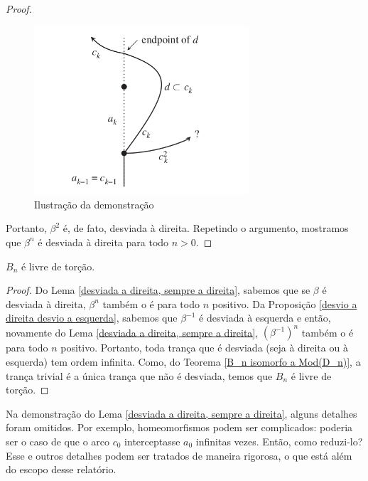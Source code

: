 \begin{proof}
		\begin{figure}[H]
			\begin{center}
				\includegraphics[width=8cm]{Images/demosntracao_lema.png}
			\end{center}\caption{Ilustração da demonstração}
			\label{ilustracao da demonstracao}
		\end{figure}
		\par\vspace{0.3cm} Portanto, $\beta^2$ é, de fato, desviada à direita. Repetindo o argumento, mostramos que $\beta^n$ é desviada à direita para todo $n>0$.
	\end{proof}
	
	\begin{corollary}
		\label{B_n livre de torcao por diagramas de curva}
		$B_n$ é livre de torção.
	\end{corollary}
	\begin{proof}
		Do Lema \eqref{desviada a direita, sempre a direita}, sabemos que se $\beta$ é desviada à direita, $\beta^n$ também o é para todo $n$ positivo. Da Proposição \eqref{desvio a direita desvio a esquerda}, sabemos que $\beta^{-1}$ é desviada à esquerda e então, novamente do Lema \eqref{desviada a direita, sempre a direita}, $(\beta^{-1})^n$ também o é para todo $n$ positivo. Portanto, toda trança que é desviada (seja à direita ou à esquerda) tem ordem infinita. Como, do Teorema \eqref{B_n isomorfo a Mod(D_n)}, a trança trivial é a única trança que não é desviada, temos que $B_n$ é livre de torção.
	\end{proof}
	
	\begin{remark}
		Na demonstração do Lema \eqref{desviada a direita, sempre a direita}, alguns detalhes foram omitidos. Por exemplo, homeomorfismos podem ser complicados: poderia ser o caso de que o arco $c_0$ interceptasse $a_0$ infinitas vezes. Então, como reduzi-lo? Esse e outros detalhes podem ser tratados de maneira rigorosa, o que está além do escopo desse relatório.
	\end{remark}
	
